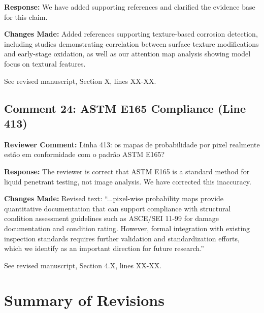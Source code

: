 \documentclass[11pt]{article}
\newcommand{\reviewercomment}[1]{\textcolor{reviewercolor}{\textbf{Reviewer Comment:} #1}}
\newcommand{\response}[1]{\textcolor{responsecolor}{\textbf{Response:} #1}}
\newcommand{\change}[1]{\textcolor{changecolor}{\textbf{Changes Made:} #1}}
\begin{document}
\response{We have added supporting references and clarified the evidence base for this claim.}

\change{Added references supporting texture-based corrosion detection, including studies demonstrating correlation between surface texture modifications and early-stage oxidation, as well as our attention map analysis showing model focus on textural features.

See revised manuscript, Section X, lines XX-XX.}

\subsection{Comment 24: ASTM E165 Compliance (Line 413)}

\reviewercomment{Linha 413: os mapas de probabilidade por pixel realmente estão em conformidade com o padrão ASTM E165?}

\response{The reviewer is correct that ASTM E165 is a standard method for liquid penetrant testing, not image analysis. We have corrected this inaccuracy.}

\change{Revised text: ``...pixel-wise probability maps provide quantitative documentation that can support compliance with structural condition assessment guidelines such as ASCE/SEI 11-99 for damage documentation and condition rating. However, formal integration with existing inspection standards requires further validation and standardization efforts, which we identify as an important direction for future research.''

See revised manuscript, Section 4.X, lines XX-XX.}

\section{Summary of Revisions}
\end{document}
